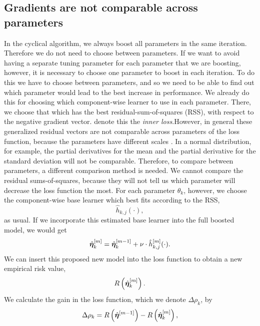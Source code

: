 \subsection{Gradients are not comparable across parameters}
In the cyclical algorithm, we always boost all parameters in the same iteration. Therefore we do not need to choose between parameters. If we want to avoid having a separate tuning parameter for each parameter that we are boosting, however, it is necessary to choose one parameter to boost in each iteration. To do this we have to choose between parameters, and so we need to be able to find out which parameter would lead to the best increase in performance. We already do this for choosing which component-wise learner to use in each parameter. There, we choose that which has the best residual-sum-of-squares (RSS), with respect to the negative gradient vector. \citet{thomas2018} denote this the \textit{inner loss}.However, in general these generalized residual vectors are not comparable across parameters of the loss function, because the parameters have different scales \citep{thomas2018}. In a normal distribution, for example, the partial derivatives for the mean and the partial derivative for the standard deviation will not be comparable. Therefore, to compare between parameters, a different comparison method is needed. We cannot compare the residual sums-of-squares, because they will not tell us which parameter will decrease the loss function the most. For each parameter $\theta_k$, however, we choose the component-wise base learner which best fits according to the RSS,
\begin{equation}
    \hat{h}_{k,j}(\cdot),
\end{equation}
as usual. If we incorporate this estimated base learner into the full boosted model, we would get
\begin{equation}
    \hat{\boldsymbol{\eta}}^{[m]}_{k}=\hat{\boldsymbol{\eta}}_k^{[m-1]}+\nu\cdot\hat{h}^{[m]}_{k,j}(\cdot).
\end{equation}
We can insert this proposed new model into the loss function to obtain a new empirical risk value,
\begin{equation}
    R\left(\hat{\boldsymbol{\eta}}_{k}^{[m]}\right).
\end{equation}
We calculate the gain in the loss function, which we denote $\Delta\rho_{k}$, by
\begin{equation}
    \Delta\rho_{k}=R\left(\hat{\boldsymbol{\eta}}^{[m-1]}\right)-R\left(\hat{\boldsymbol{\eta}}_{k}^{[m]}\right),
\end{equation}
